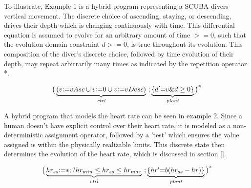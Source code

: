 \documentclass[sigconf,screen]{acmart}
\begin{document}
To illustrate, Example 1 is a hybrid program representing a SCUBA divers vertical movement. The discrete choice of ascending, staying, or descending, drives their depth which is changing continuously with time. This differential equation is assumed to evolve for an arbitrary amount of time $>=0$, such that the evolution domain constraint $d>=0$, is true throughout its evolution. This composition of the diver's discrete choice, followed by time evolution of their depth, may repeat arbitrarily many times as indicated by the repetition operator *.
\begin{example}
\label{ex:simpleDiver}
\[
    {
      \big(\underbrace{(v{:=}vAsc \cup v{:=} 0 \cup v{:=}vDesc)}_{\textit{ctrl}}\ ;
      \underbrace{\{d'{=}v \& d \ge 0\}}_{\textit{plant}}\big)
    }^{*}
\]

\end{example}

A hybrid program that models the heart rate can be seen in example 2. Since a human doesn't have explicit control over their heart rate, it is modeled as a non-deterministic assignment operator, followed by a 'test' which ensures the value assigned is within the physically realizable limits. This discrete state then determines the evolution of the heart rate, which is discussed in section [].

\begin{example}
\label{ex:simpleHR}
\[
    {
      \big(\underbrace{hr_{ss}{:=}*;?hr_{min}\leq hr_{ss}\leq hr_{max}}_{\textit{ctrl}}\ ;
      \underbrace{\{hr'{=}b(hr_{ss}-hr)\}}_{\textit{plant}}\big)
    }^{*}
\]
\end{example}
\end{document}
